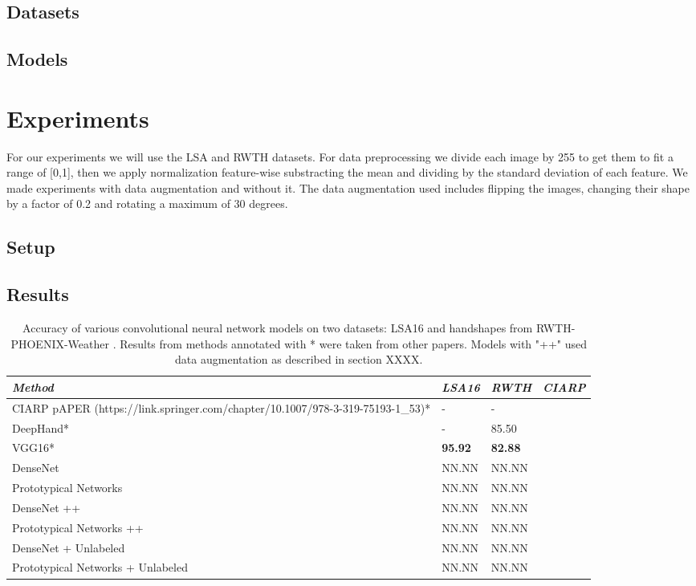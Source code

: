 \documentclass[runningheads,a4paper]{llncs}
\begin{document}
\subsection{Datasets}


\subsection{Models}


\section{Experiments}
For our experiments we will use the LSA and RWTH datasets. For data preprocessing we divide each image by 255 to get them to fit a range of [0,1], then we apply normalization feature-wise substracting the mean  and dividing by the standard deviation of each feature. We made experiments with data augmentation and without it. The data augmentation used includes flipping the images, changing their shape by a factor of 0.2 and rotating a maximum of 30 degrees.
\subsection{Setup}

\subsection{Results}

\begin{table}[h!]
\centering
\begin{tabular}{ p{18em} p{7em} p{8em} p{8em}}
\toprule
\emph{Method} & \emph{LSA16} &  \emph{RWTH}  &  \emph{CIARP} \\ \midrule
CIARP pAPER (https://link.springer.com/chapter/10.1007/978-3-319-75193-1\_53)* \cite{CIARP_resultados} & - & - &  \\
DeepHand* \cite{koller2016deep} & - & 85.50 \\
VGG16* \cite{Quiroga_blablabla} & \textbf{95.92} & \textbf{82.88} \\
DenseNet \cite{} & NN.NN & NN.NN \\
Prototypical Networks \cite{} & NN.NN & NN.NN \\
DenseNet ++ \cite{} & NN.NN & NN.NN \\
Prototypical Networks ++\cite{} & NN.NN & NN.NN \\
DenseNet + Unlabeled \cite{} & NN.NN & NN.NN \\
Prototypical Networks + Unlabeled \cite{} & NN.NN & NN.NN \\
\bottomrule
\end{tabular}
\caption{Accuracy of various convolutional neural network models on two datasets: LSA16 \cite{ronchetti2016a} and handshapes from RWTH-PHOENIX-Weather \cite{koller2016deep}. Results from methods annotated with * were taken from other papers. Models with "++" used data augmentation as described in section XXXX. \label{tab:results}}
\end{table}
\end{document}
